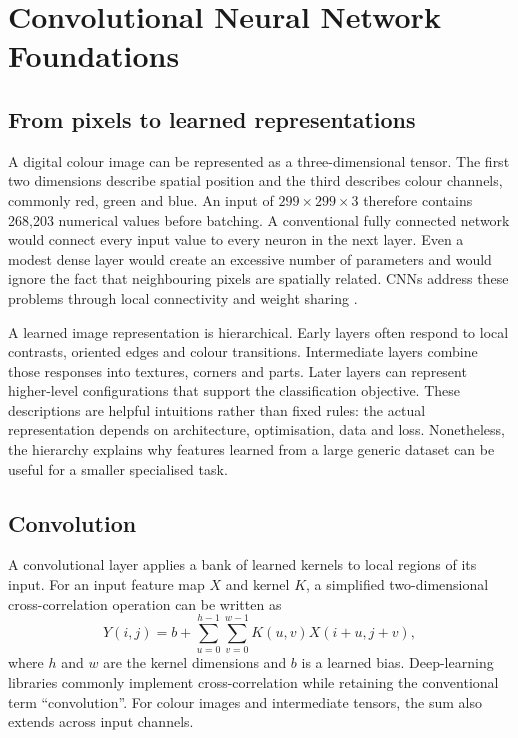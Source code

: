 \chapter{Convolutional Neural Network Foundations}
\label{chap:cnn}

\section{From pixels to learned representations}
A digital colour image can be represented as a three-dimensional tensor. The first two dimensions describe spatial position and the third describes colour channels, commonly red, green and blue. An input of $299\times299\times3$ therefore contains 268,203 numerical values before batching. A conventional fully connected network would connect every input value to every neuron in the next layer. Even a modest dense layer would create an excessive number of parameters and would ignore the fact that neighbouring pixels are spatially related. CNNs address these problems through local connectivity and weight sharing \citep{lecun1998gradient,lecun2015deep}.

A learned image representation is hierarchical. Early layers often respond to local contrasts, oriented edges and colour transitions. Intermediate layers combine those responses into textures, corners and parts. Later layers can represent higher-level configurations that support the classification objective. These descriptions are helpful intuitions rather than fixed rules: the actual representation depends on architecture, optimisation, data and loss. Nonetheless, the hierarchy explains why features learned from a large generic dataset can be useful for a smaller specialised task.

\section{Convolution}
A convolutional layer applies a bank of learned kernels to local regions of its input. For an input feature map $X$ and kernel $K$, a simplified two-dimensional cross-correlation operation can be written as
\begin{equation}
Y(i,j)=b+\sum_{u=0}^{h-1}\sum_{v=0}^{w-1}K(u,v)X(i+u,j+v),
\end{equation}
where $h$ and $w$ are the kernel dimensions and $b$ is a learned bias. Deep-learning libraries commonly implement cross-correlation while retaining the conventional term ``convolution''. For colour images and intermediate tensors, the sum also extends across input channels.

